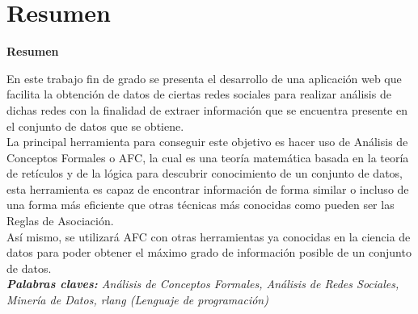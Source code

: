 \documentclass[../../main.tex]{subfiles}
\begin{document}
\makeatletter
\renewenvironment{abstract}{%
    \if@twocolumn
      \section*{Resumen \\}%
    \else %
    \begin{flushright}
        {\filleft\Huge\bfseries\fontsize{48pt}{12}\selectfont Resumen\vspace{\z@}}%
        \end{flushright}
      \quotation
    \fi}
    {\if@twocolumn\else\endquotation\fi}
\makeatother

\begin{abstract}

En este trabajo fin de grado se presenta el desarrollo de una aplicación web que facilita la obtención de datos de ciertas redes sociales para realizar análisis de dichas redes con la finalidad de extraer información que se encuentra presente en el conjunto de datos que se obtiene. \\

La principal herramienta para conseguir este objetivo es hacer uso de Análisis de Conceptos Formales o AFC, la cual es una teoría matemática basada en la teoría de retículos y de la lógica para descubrir conocimiento de un conjunto de datos, esta herramienta es capaz de encontrar información de forma similar o incluso de una forma más eficiente que otras técnicas más conocidas como pueden ser las Reglas de Asociación. \\

Así mismo, se utilizará AFC con otras herramientas ya conocidas en la ciencia de datos para poder obtener el máximo grado de información posible de un conjunto de datos. \\

\noindent\textit{\textbf{Palabras claves:} Análisis de Conceptos Formales, Análisis de Redes Sociales, Minería de Datos, \gls{rlang} (Lenguaje de programación)}
\end{abstract}
\end{document}
